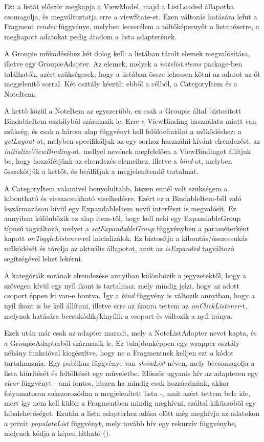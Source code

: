Ezt a listát először megkapja a ViewModel, majd a ListLoaded állapotba csomagolja, és megváltoztatja erre a viewState-et. Ezen változás hatására lefut a Fragment \emph{render} függvénye, melyben lecserélem a töltőképernyőt a listanézetre, a megkapott adatokat pedig átadom a lista adapterének.

A Groupie működéséhez két dolog kell: a listában tárolt elemek megvalósítása, illetve egy GroupieAdapter. Az elemek, melyek a \emph{notelist.items} package-ben találhatók, azért szükségesek, hogy a listában össze lehessen kötni az adatot az őt megjelenítő sorral. Két osztály készült ebből a célból, a CategoryItem és a NoteItem. 

A kettő közül a NoteItem az egyszerűbb, ez csak a Groupie által biztosított BindableItem osztályból származik le. Erre a ViewBinding használata miatt van szükség, és csak a három alap függvényt kell felüldefiniálni a működéshez: a \emph{getLayout}-ot, melyben specifikáljuk az egy sorhoz használni kívánt elrendezést, az \emph{initializeViewBinding}-ot, mellyel nevének megfelelően a ViewBindingot állítjuk be, hogy hozzáférjünk az elrendezés elemeihez, illetve a \emph{bind}-ot, melyben összekötjük a kettőt, és beállítjuk a megjelenítendő tartalmat. 

A CategoryItem valamivel bonyolultabb, hiszen ennél volt szükségem a kibontható és visszacsukható viselkedésre. Ezért ez a BindableItem-ből való leszármazáson kívül egy ExpandableItem nevű interfészt is megvalósít. Ez annyiban különbözik az alap item-től, hogy kell neki egy ExpandableGroup típusú tagváltozó, melyet a \emph{setExpandableGroup} függvényben a paraméterként kapott \emph{onToggleListener}-rel inicializálok. Ez biztosítja a kibontás/összecsukás működését és tárolja az aktuális állapotot, amit az \emph{isExpanded} tagváltozó segítségével lehet lekérni. 

A kategóriák sorának elrendezése annyiban különbözik a jegyzetektől, hogy a szövegen kívül egy nyíl ikont is tartalmaz, mely mindig jelzi, hogy az adott csoport éppen ki van-e bontva. Így a \emph{bind} függvény is változik annyiban, hogy a nyíl ikont is be kell állítani, illetve erre az ikonra tettem az \emph{onClickListener}-t, melynek hatására becsukódik/kinyílik a csoport és változik a nyíl iránya. 

Ezek után már csak az adapter maradt, mely a NoteListAdapter nevet kapta, és a GroupieAdapterből származik le. Ez tulajdonképpen egy wrapper osztály néhány funkcióval kiegészítve, hogy ne a Fragmentnek kelljen ezt a kódot tartalmaznia. Egy publikus függvénye van \emph{showList} néven, mely becsomagolja a lista kiürítését és feltöltését egy műveletbe. Először ugyanis hív az adapteren egy \emph{clear} függvényt - ami fontos, hiszen ha mindig csak hozzáadnánk, akkor folyamatosan sokszorozódna a megjelenített lista -, amit azért tettem bele ide, mert így nem kell külön a Fragmentben mindig meghívni, ezáltal kiküszöböl egy hibalehetőséget. Ezután a lista adapterhez adása előtt még meghívja az adatokon a privát \emph{populateList} függvényt, mely tovább hív egy rekurzív függvénybe, melynek kódja a képen látható ().

